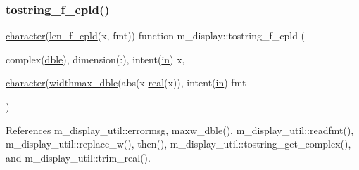 \subsubsection{\texorpdfstring{tostring\+\_\+f\+\_\+cpld()}{tostring\_f\_cpld()}}
{\footnotesize\ttfamily \hyperlink{option__stopwatch_83_8txt_abd4b21fbbd175834027b5224bfe97e66}{character}(\hyperlink{namespacem__display_a803611d2a793f2a4aa7563b6c8295cb3}{len\+\_\+f\+\_\+cpld}(x, fmt)) function m\+\_\+display\+::tostring\+\_\+f\+\_\+cpld (\begin{DoxyParamCaption}\item[{complex(\hyperlink{namespacem__display_a46d90b75b6ccef7ccade133e5847e815}{dble}), dimension(\+:), intent(\hyperlink{M__journal_83_8txt_afce72651d1eed785a2132bee863b2f38}{in})}]{x,  }\item[{\hyperlink{option__stopwatch_83_8txt_abd4b21fbbd175834027b5224bfe97e66}{character}(\hyperlink{namespacem__display_aed07125464a462f9fa53ed2333846273}{widthmax\+\_\+dble}(abs(x-\/\hyperlink{read__watch_83_8txt_abdb62bde002f38ef75f810d3a905a823}{real}(x)), intent(\hyperlink{M__journal_83_8txt_afce72651d1eed785a2132bee863b2f38}{in})}]{fmt }\end{DoxyParamCaption})\hspace{0.3cm}{\ttfamily [private]}}



References m\+\_\+display\+\_\+util\+::errormsg, maxw\+\_\+dble(), m\+\_\+display\+\_\+util\+::readfmt(), m\+\_\+display\+\_\+util\+::replace\+\_\+w(), then(), m\+\_\+display\+\_\+util\+::tostring\+\_\+get\+\_\+complex(), and m\+\_\+display\+\_\+util\+::trim\+\_\+real().

